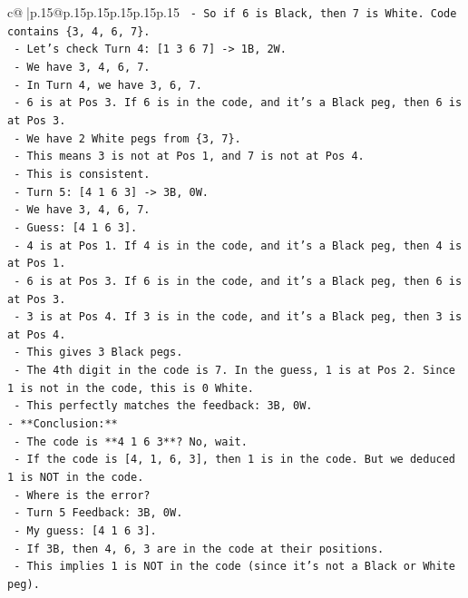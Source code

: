 \documentclass{article}
\begin{document}
{\begin{supertabular}{c@{$\;$}|p{.15\linewidth}@{}p{.15\linewidth}p{.15\linewidth}p{.15\linewidth}p{.15\linewidth}p{.15\linewidth}}
{{{\texttt{    {-} So if 6 is Black, then 7 is White. Code contains \{3, 4, 6, 7\}.} \\
\texttt{    {-} Let's check Turn 4: {[}1 3 6 7{]} {-}> 1B, 2W.} \\
\texttt{      {-} We have 3, 4, 6, 7.} \\
\texttt{      {-} In Turn 4, we have 3, 6, 7.} \\
\texttt{      {-} 6 is at Pos 3. If 6 is in the code, and it's a Black peg, then 6 is at Pos 3.} \\
\texttt{      {-} We have 2 White pegs from \{3, 7\}.} \\
\texttt{      {-} This means 3 is not at Pos 1, and 7 is not at Pos 4.} \\
\texttt{      {-} This is consistent.} \\
\texttt{    {-} Turn 5: {[}4 1 6 3{]} {-}> 3B, 0W.} \\
\texttt{      {-} We have 3, 4, 6, 7.} \\
\texttt{      {-} Guess: {[}4 1 6 3{]}.} \\
\texttt{      {-} 4 is at Pos 1. If 4 is in the code, and it's a Black peg, then 4 is at Pos 1.} \\
\texttt{      {-} 6 is at Pos 3. If 6 is in the code, and it's a Black peg, then 6 is at Pos 3.} \\
\texttt{      {-} 3 is at Pos 4. If 3 is in the code, and it's a Black peg, then 3 is at Pos 4.} \\
\texttt{      {-} This gives 3 Black pegs.} \\
\texttt{      {-} The 4th digit in the code is 7. In the guess, 1 is at Pos 2. Since 1 is not in the code, this is 0 White.} \\
\texttt{      {-} This perfectly matches the feedback: 3B, 0W.} \\
\texttt{{-} **Conclusion:**} \\
\texttt{  {-} The code is **4 1 6 3**? No, wait.} \\
\texttt{  {-} If the code is {[}4, 1, 6, 3{]}, then 1 is in the code. But we deduced 1 is NOT in the code.} \\
\texttt{  {-} Where is the error?} \\
\texttt{  {-} Turn 5 Feedback: 3B, 0W.} \\
\texttt{  {-} My guess: {[}4 1 6 3{]}.} \\
\texttt{  {-} If 3B, then 4, 6, 3 are in the code at their positions.} \\
\texttt{  {-} This implies 1 is NOT in the code (since it's not a Black or White peg).} \\
}}}
\end{supertabular}}
\end{document}
